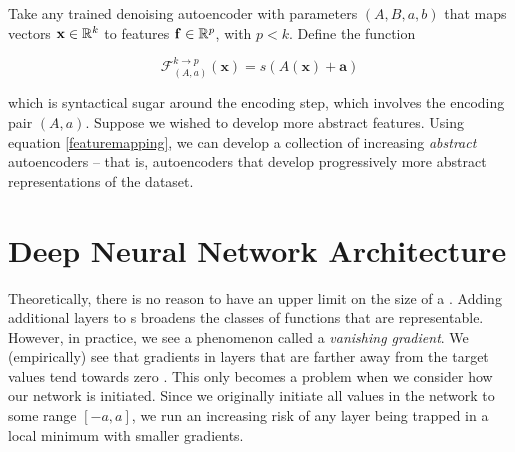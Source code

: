 Take any trained denoising autoencoder with parameters $(A,B,a,b)$ that maps vectors $\mathbf{x}\in\mathbb{R}^k$ to features $\mathbf{f}\in\mathbb{R}^p$, with $p<k$. Define the function

\begin{equation}
\label{featuremapping}
\mathcal{F}_{(A,a)}^{k\rightarrow p}(\mathbf{x}) = s(A(\mathbf{x}) + \mathbf{a})
\end{equation}

which is syntactical sugar around the encoding step, which involves the encoding pair $(A,a)$. Suppose we wished to develop more abstract features. Using equation \eqref{featuremapping}, we can develop a collection of increasing \emph{abstract} autoencoders -- that is, autoencoders that develop progressively more abstract representations of the dataset. 










\section{Deep Neural Network Architecture}

Theoretically, there is no reason to have an upper limit on the size of a \nn{}. Adding additional layers to \nn{}s broadens the classes of functions that are representable. However, in practice, we see a phenomenon called a \emph{vanishing gradient}. We (empirically) see that gradients in layers that are farther away from the target values tend towards zero \citep{trainingdifficulty}. This only becomes a problem when we consider how our network is initiated. Since we originally initiate all values in the network to some range $[-a,a]$, we run an increasing risk of any layer being trapped in a local minimum with smaller gradients. 

























